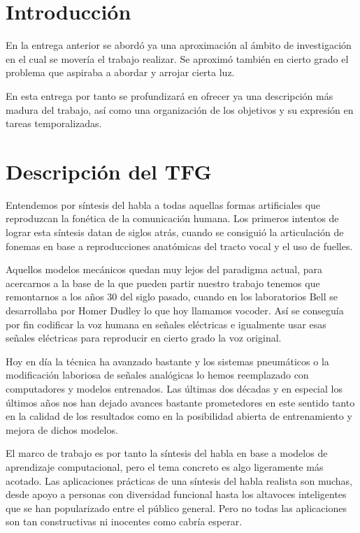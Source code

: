 
\section{Introducción}

En la entrega anterior se abordó ya una aproximación al ámbito de investigación en el cual se movería el trabajo realizar. Se aproximó también en cierto grado el problema que aspiraba a abordar y arrojar cierta luz.

En esta entrega por tanto se profundizará en ofrecer ya una descripción más madura del trabajo, así como una organización de los objetivos y su expresión en tareas temporalizadas.

\section{Descripción del TFG}

Entendemos por síntesis del habla a todas aquellas formas artificiales que reproduzcan la fonética de la comunicación humana. Los primeros intentos de lograr esta síntesis datan de siglos atrás, cuando se consiguió la articulación de fonemas en base a reproducciones anatómicas del tracto vocal y el uso de fuelles.

Aquellos modelos mecánicos quedan muy lejos del paradigma actual, para acercarnos a la base de la que pueden partir nuestro trabajo tenemos que remontarnos a los años 30 del siglo pasado, cuando en los laboratorios Bell se desarrollaba por Homer Dudley lo que hoy llamamos vocoder. Así se conseguía por fin codificar la voz humana en señales eléctricas e igualmente usar esas señales eléctricas para reproducir en cierto grado la voz original.

Hoy en día la técnica ha avanzado bastante y los sistemas pneumáticos o la modificación laboriosa de señales analógicas lo hemos reemplazado con computadores y modelos entrenados. Las últimas dos décadas y en especial los últimos años nos han dejado avances bastante prometedores en este sentido tanto en la calidad de los resultados como en la posibilidad abierta de entrenamiento y mejora de dichos modelos.

El marco de trabajo es por tanto la síntesis del habla en base a modelos de aprendizaje computacional, pero el tema concreto es algo ligeramente más acotado. Las aplicaciones prácticas de una síntesis del habla realista son muchas, desde apoyo a personas con diversidad funcional hasta los altavoces inteligentes que se han popularizado entre el público general. Pero no todas las aplicaciones son tan constructivas ni inocentes como cabría esperar.

